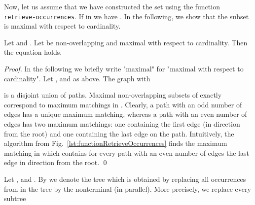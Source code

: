 \documentclass[12pt]{llncs}
\begin{document}
Now, let us assume that we have constructed the set  using the function \texttt{retrieve-occurrences}. If  in  we have 
. In the following, we show that the subset  is maximal with respect to cardinality.
\begin{lemma}\label{lemma:occtIsMaximal}
	Let  and . Let  be non-overlapping and maximal with respect to cardinality. Then the equation  holds.
\end{lemma}
\begin{proof}
	In the following we briefly write "maximal" for "maximal with
        respect to cardinality". Let ,  and  as
        above. The graph  with

is a disjoint union of paths. Maximal non-overlapping subsets of  exactly correspond to maximum matchings in . Clearly, a path with an odd number of edges has a unique maximum matching, whereas a path with an even number of edges has two maximum matchings: one containing the first edge (in direction from the root) and one containing the last edge on the path. Intuitively, the algorithm from Fig.~\ref{lst:functionRetrieveOccurrences} finds the maximum matching in  which contains for every path with an even number of edges the last edge in direction from the root.
\qed
\end{proof}
Let ,  and . By  we denote the tree which is obtained by replacing all occurrences from  in the tree  by the nonterminal  (in parallel). More precisely, we replace every subtree
\end{document}
